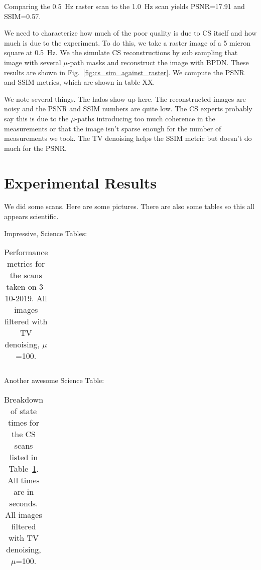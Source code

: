 \documentclass[11pt]{article}
\begin{document}
Comparing the 0.5~Hz raster scan to the 1.0~Hz scan yields PSNR=17.91 and SSIM=0.57.

We need to characterize how much of the poor quality is due to CS itself and how much is due to the experiment. To do this, we take a raster image of a 5 micron square at 0.5~Hz. We the simulate CS reconstructions by sub sampling that image with several $\mu$-path masks and reconstruct the image with BPDN. These results are shown in Fig.~\ref{fig:cs_sim_against_raster}. We compute the PSNR and SSIM metrics, which are shown in table XX.

We note several things. The halos show up here. The reconstructed images are noisy and the PSNR and SSIM numbers are quite low. The CS experts probably say this is due to the $\mu$-paths introducing too much coherence in the measurements or that the image isn't sparse enough for the number of measurements we took. The TV denoising helps the SSIM metric but doesn't do much for the PSNR.

\section{Experimental Results}\label{sec:results:final}
We did some scans. Here are some pictures. There are also some tables so this all appears scientific.

\begin{figure}
    
    \caption{}  
    \label{fig:resultsF1_images}
\end{figure}

\begin{figure}
    
    \caption{}  
    \label{fig:resultsF1_errs}
\end{figure}

Impressive, Science Tables:
\begin{table}[htbp]
  \centering
      \caption{Performance metrics for the scans taken on 3-10-2019.  All images filtered with TV denoising, $\mu$=100.}
      \begin{tabular}{cccccc}
        
      \end{tabular}
      \label{tab:rast_vs_cs_v1}
\end{table}


Another awesome Science Table:
\begin{table}
  \centering
  \caption{Breakdown of state times for the CS scans listed in Table~\ref{tab:rast_vs_cs_v1}. All times are in seconds. All images filtered with TV denoising, $\mu$=100.}
  \begin{tabular}{cccccccc}
    
  \end{tabular}
\end{table}
\end{document}
